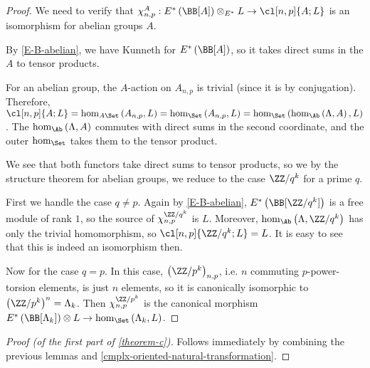 \begin{proof}
	We need to verify that
	$
	\chi_{n,p}^A:
	E^*\left(\BB[A]\right) \otimes_{E^*} L
	\to \cl[n,p]{A; L}
	$
	is an isomorphism for abelian groups $A$.
	
	By \ref{E-B-abelian}, we have Kunneth for $E^*\left(\BB[A]\right)$, so it takes direct sums in the $A$ to tensor products.
	
	For an abelian group, the $A$-action on $A_{n,p}$ is trivial (since it is by conjugation).
	Therefore,
	$
	\cl[n,p]{A; L}
	= \hom_{A\Set}\left(A_{n,p}, L\right)
	= \hom_{\Set}\left(A_{n,p}, L\right)
	= \hom_{\Set}\left(\hom_{\Ab}\left(\Lambda, A\right), L\right)
	$.
	The $\hom_{\Ab}\left(\Lambda, A\right)$ commutes with direct sums in the second coordinate, and the outer $\hom_{\Set}$ takes them to the tensor product.
	
	We see that both functors take direct sums to tensor products, so we by the structure theorem for abelian groups, we reduce to the case $\ZZ/q^k$ for a prime $q$.
	
	First we handle the case $q \neq p$.
	Again by \ref{E-B-abelian}, $E^*\left(\BB[\ZZ/q^k]\right)$ is a free module of rank $1$, so the source of $\chi_{n,p}^{\ZZ/q^k}$ is $L$.
	Moreover, $\hom_{\Ab}\left(\Lambda, \ZZ/q^k\right)$ has only the trivial homomorphism, so $\cl[n,p]{\ZZ/q^k; L} = L$.
	It is easy to see that this is indeed an isomorphism then.
	
	Now for the case $q = p$.
	In this case, $\left(\ZZ/p^k\right)_{n,p}$, i.e. $n$ commuting $p$-power-torsion elements, is just $n$ elements, so it is canonically isomorphic to $\left(\ZZ/p^k\right)^n = \Lambda_k$.
	Then $\chi_{n,p}^{\ZZ/p^k}$ is the canonical morphism $E^*\left(\BB[\Lambda_k]\right) \otimes L \to \hom_{\Set}\left(\Lambda_k, L\right)$.
\end{proof}

\begin{proof}[Proof (of the first part of \ref{theorem-c})]
	Follows immediately by combining the previous lemmas and \ref{cmplx-oriented-natural-transformation}.
\end{proof}
